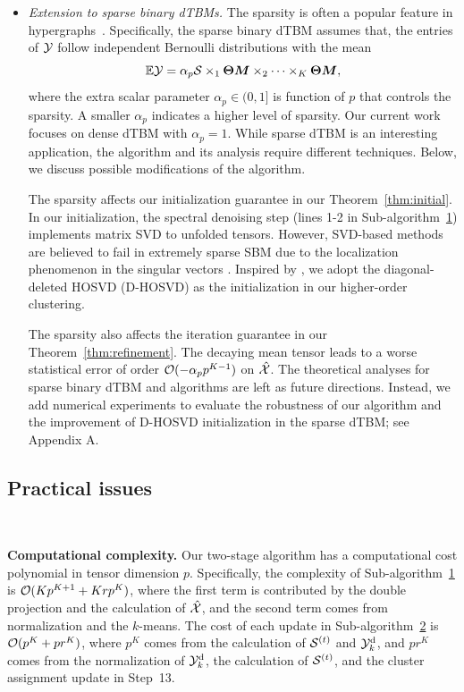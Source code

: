 \documentclass[journal]{IEEEtran}
\theoremstyle{definition}
\theoremstyle{definition}
\begin{document}
\begin{itemize}[wide]
\item \textit{Extension to sparse binary dTBMs.} The sparsity is often a popular feature in hypergraphs~\citep{florescu2016spectral,ke2019community, ahn2018hypergraph}. Specifically, the sparse binary dTBM assumes that, the entries of $\mathcal{Y}$ follow independent Bernoulli distributions with the mean
     \begin{equation}\label{eq:sparse_dtbm}
    \bbE\tY = \alpha_p \tS \times_1 \mTheta \mM \times_2  \cdots \times_K \mTheta \mM,
\end{equation}
where the extra scalar parameter $\alpha_p \in (0,1]$ is function of $p$ that controls the sparsity. A smaller $\alpha_p$ indicates a higher level of sparsity. Our current work focuses on dense dTBM with $\alpha_p=1$.  While sparse dTBM is an interesting application, the algorithm and its analysis require different techniques. Below, we discuss possible modifications of the algorithm.

The sparsity affects our initialization guarantee in our Theorem~\ref{thm:initial}. In our initialization, the spectral denoising step (lines 1-2 in Sub-algorithm~\hyperref[alg:main]{1}) implements matrix SVD to unfolded tensors. %
However, SVD-based methods are believed to fail in extremely sparse SBM due to the localization phenomenon in the singular vectors \citep{florescu2016spectral}. Inspired by \cite{florescu2016spectral}, we adopt the diagonal-deleted HOSVD (D-HOSVD) \citep{ke2019community} as the initialization in our higher-order clustering. 

The sparsity also affects the iteration guarantee in our Theorem~\ref{thm:refinement}. The decaying mean tensor leads to a worse statistical error of order $\mathcal{O}( -\alpha_p p^{K-1})$ on $\hat {\mathcal{X}}$. The theoretical analyses for sparse binary dTBM and algorithms are left as future directions. Instead, we add numerical experiments to evaluate the robustness of our algorithm and the improvement of D-HOSVD initialization in the sparse dTBM; see Appendix A.

\end{itemize}

\subsection{Practical issues}~\label{subsec:exten}

{\bf Computational complexity.} Our two-stage algorithm has a computational cost polynomial in tensor dimension $p$. Specifically, the complexity of Sub-algorithm~\hyperref[alg:main]{1} is $\mathcal{O}(K p^{K+1} + Krp^K)$, where the first term is contributed by the double projection and the calculation of $\hat {\mathcal{X}}$, and the second term comes from normalization and the $k$-means. The cost of each update in Sub-algorithm~\hyperref[alg:main]{2} is $\mathcal{O}(p^K + pr^K)$, where $p^K$ comes from the calculation of $\mathcal{S}^{(t)}$ and $\mathcal{Y}^{\text{d}}_k$, and $pr^K$ comes from the normalization of $\mathcal{Y}^{\text{d}}_k$, the calculation of $\mathcal{S}^{(t)}$, and the cluster assignment update in Step~13.
\end{document}
